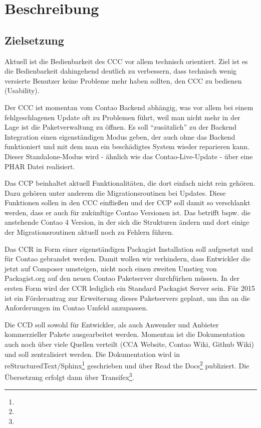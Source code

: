 \documentclass[
paper=a4,
draft=false,%
fontsize=10pt%
]{scrartcl}
\begin{document}
\section{Beschreibung}
\label{sec:description}

\subsection{Zielsetzung}

Aktuell ist die Bedienbarkeit des CCC vor allem technisch orientiert. Ziel ist es die Bedienbarkeit dahingehend deutlich zu verbessern, dass technisch wenig versierte Benutzer keine Probleme mehr haben sollten, den CCC zu bedienen (Usability).

Der CCC ist momentan vom Contao Backend abhängig, was vor allem bei einem fehlgeschlagenen Update oft zu Problemen führt, weil man nicht mehr in der Lage ist die Paketverwaltung zu öffnen. Es soll “zusätzlich” zu der Backend Integration einen eigenständigen Modus geben, der auch ohne das Backend funktioniert und mit dem man ein beschädigtes System wieder reparieren kann. Dieser Standalone-Modus wird - ähnlich wie das Contao-Live-Update - über eine PHAR Datei realisiert.

Das CCP beinhaltet aktuell Funktionalitäten, die dort einfach nicht rein gehören. Dazu gehören unter anderem die Migrationsroutinen bei Updates. Diese Funktionen sollen in den CCC einfließen und der CCP soll damit so verschlankt werden, dass er auch für zukünftige Contao Versionen ist. Das betrifft bspw. die anstehende Contao 4 Version, in der sich die Strukturen ändern und dort einige der Migrationsroutinen aktuell noch zu Fehlern führen.

Das CCR in Form einer eigenständigen Packagist Installation soll aufgesetzt und für Contao gebrandet werden. Damit wollen wir verhindern, dass Entwickler die jetzt auf Composer umsteigen, nicht noch einen zweiten Umstieg von Packagist.org auf den neuen Contao Paketserver durchfürhen müssen. In der ersten Form wird der CCR lediglich ein Standard Packagist Server sein. Für 2015 ist ein Förderantrag zur Erweiterung dieses Paketservers geplant, um ihn an die Anforderungen im Contao Umfeld anzupassen.

Die CCD soll sowohl für Entwickler, als auch Anwender und Anbieter kommerzieller Pakete ausgearbeitet werden. Momentan ist die Dokumentation auch noch über viele Quellen verteilt (CCA Website, Contao Wiki, Github Wiki) und soll zentralisiert werden. Die Dokumentation wird in reStructuredText/Sphinx\footnote{} geschrieben und über Read the Docs\footnote{} publiziert. Die Übersetzung erfolgt dann über Transifex\footnote{}.
\end{document}
